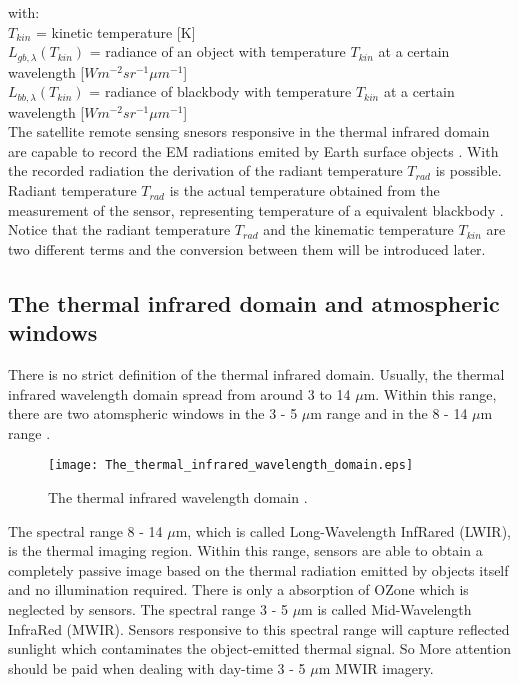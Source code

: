 \noindent with:\\
\indent $T_{kin}$ = kinetic temperature [K]\\
\indent $L_{gb, \lambda}(T_{kin})$ = radiance of an object with temperature $T_{kin}$ at a certain wavelength [$W m^{-2} sr^{-1} \mu m^{-1}$]\\
\indent $L_{bb, \lambda}(T_{kin})$ = radiance of blackbody with temperature $T_{kin}$ at a certain wavelength [$W m^{-2} sr^{-1} \mu m^{-1}$]\\

\noindent The satellite remote sensing snesors responsive in the thermal infrared domain are capable to record the EM radiations emited by Earth surface objects \parencite{Reference204}. With the recorded radiation the derivation of the radiant temperature $T_{rad}$ is possible. Radiant temperature $T_{rad}$ is the actual temperature obtained from the measurement of the sensor, representing temperature of a equivalent blackbody \parencite{Reference206}. Notice that the radiant temperature $T_{rad}$ and the kinematic temperature $T_{kin}$ are two different terms and the conversion between them will be introduced later.\\


\subsection{The thermal infrared domain and atmospheric windows}
There is no strict definition of the thermal infrared domain. Usually, the thermal infrared wavelength domain spread from around 3 to 14 $\mu$m. Within this range, there are two atomspheric windows in the 3 - 5 $\mu$m range and in the 8 - 14 $\mu$m range \parencite{Reference204}. \\

\begin{figure}[!htbp]
  \centering\texttt{[image: The\_thermal\_infrared\_wavelength\_domain.eps]}
  \caption{The thermal infrared wavelength domain \parencite{Reference204}.}
  \label{fig:TIRdomain}
\end{figure}

\noindent The spectral range 8 - 14 $\mu$m, which is called Long-Wavelength InfRared (LWIR), is the thermal imaging region. Within this range, sensors are able to obtain a completely passive image based on the thermal radiation emitted by objects itself and no illumination required. There is only a absorption of OZone which is neglected by sensors. The spectral range 3 - 5 $\mu$m is called Mid-Wavelength InfraRed (MWIR). Sensors responsive to this spectral range will capture reflected sunlight which contaminates the object-emitted thermal signal. So More attention should be paid when dealing with day-time 3 - 5 $\mu$m MWIR imagery. \\

